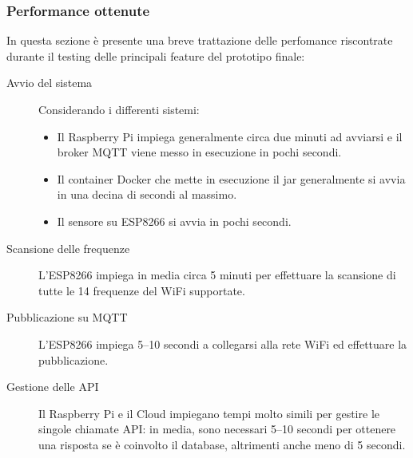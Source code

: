 \subsubsection{Performance ottenute}

In questa sezione è presente una breve trattazione delle perfomance riscontrate durante il testing delle principali feature del prototipo finale:

\begin{description}
  \item[Avvio del sistema]
    Considerando i differenti sistemi:
    \begin{itemize}
      \item Il Raspberry Pi impiega generalmente circa due minuti ad avviarsi e il broker MQTT viene messo in esecuzione in pochi secondi.
      \item Il container Docker che mette in esecuzione il jar generalmente si avvia in una decina di secondi al massimo.
      \item Il sensore su ESP8266 si avvia in pochi secondi.
    \end{itemize}
  \item[Scansione delle frequenze]
    L'ESP8266 impiega in media circa 5 minuti per effettuare la scansione di tutte le 14 frequenze del WiFi supportate.
  \item[Pubblicazione su MQTT]
    L'ESP8266 impiega 5--10 secondi a collegarsi alla rete WiFi ed effettuare la pubblicazione.
  \item[Gestione delle API]
    Il Raspberry Pi e il Cloud impiegano tempi molto simili per gestire le singole chiamate API\@:
    in media, sono necessari 5--10 secondi per ottenere una risposta se è coinvolto il database, altrimenti anche meno di 5 secondi.
\end{description}
